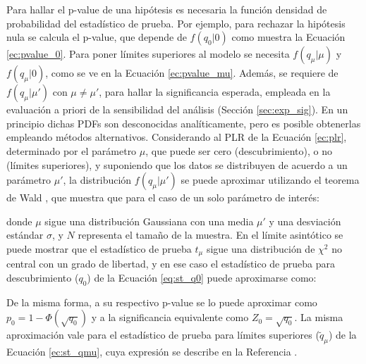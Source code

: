 Para hallar el p-value de una hipótesis es necesaria la función densidad de probabilidad del estadístico de prueba. Por ejemplo, para rechazar la hipótesis nula se calcula el p-value, que depende de $f(q_{0}|0)$ como muestra la Ecuación \ref{ec:pvalue_0}. Para poner límites superiores al modelo se necesita $f(q_{\mu}|\mu)$ y $f(q_{\mu}|0)$, como se ve en la Ecuación \ref{ec:pvalue_mu}. Además, se requiere de $f(q_{\mu}|\mu')$ con $\mu\neq\mu'$, para hallar la significancia esperada, empleada en la evaluación a priori de la sensibilidad del análisis (Sección \ref{sec:exp_sig}). En un principio dichas PDFs son desconocidas analíticamente, pero es posible obtenerlas empleando métodos alternativos.
Considerando al PLR de la Ecuación \ref{ec:plr}, determinado por el parámetro $\mu$, que puede ser cero (descubrimiento), o no (límites superiores), y suponiendo que los datos se distribuyen de acuerdo a un parámetro $\mu'$, la distribución $f(q_{\mu}|\mu')$ se puede aproximar utilizando el teorema de Wald \cite{10.2307/1990256}, que muestra que para el caso de un solo parámetro de interés:


donde $\mu$ sigue una distribución Gaussiana con una media $\mu'$ y una desviación estándar $\sigma$, y $N$ representa el tamaño de la muestra. 
En el límite asintótico se puede mostrar que el estadístico de prueba $t_{\mu}$ sigue una distribución de $\chi^{2}$ no central con un grado de libertad, y en ese caso el estadístico de prueba para descubrimiento ($q_{0}$) de la Ecuación \ref{eq:st_q0} puede aproximarse como:



De la misma forma, a su respectivo p-value se lo puede aproximar como $p_{0}=1-\Phi(\sqrt{q_{0}})$ y a la significancia equivalente como $Z_{0}=\sqrt{q_{0}}$. La misma aproximación vale para el estadístico de prueba para límites superiores ($\tilde{q}_{\mu}$) de la Ecuación \ref{ec:st_qmu}, cuya expresión se describe en la Referencia \cite{Cowan:2010js}.

